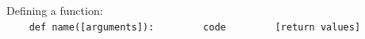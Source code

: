 Defining a function:\\
{\ex \lstinline|    def name([arguments]):|}
{\ex \lstinline|        code|}
{\ex \lstinline|        [return values]|}
